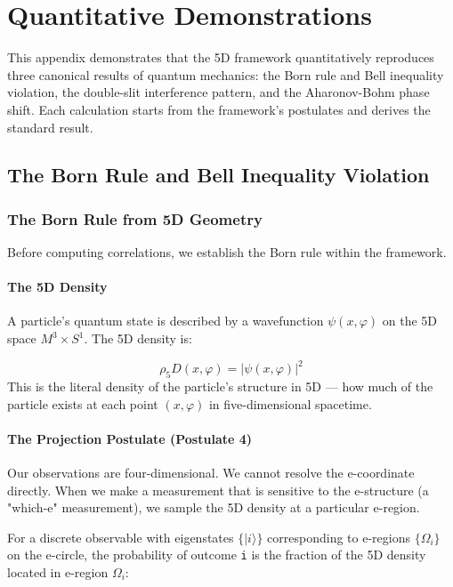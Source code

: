 \documentclass[aps,prd,preprint,superscriptaddress,longbibliography,floatfix]{revtex4-2}
\theoremstyle{remark}
\begin{document}
\section{Quantitative Demonstrations}

This appendix demonstrates that the 5D framework quantitatively reproduces three canonical results of quantum mechanics: the Born rule and Bell inequality violation, the double-slit interference pattern, and the Aharonov-Bohm phase shift. Each calculation starts from the framework's postulates and derives the standard result.



\subsection{The Born Rule and Bell Inequality Violation}


\subsubsection{The Born Rule from 5D Geometry}

Before computing correlations, we establish the Born rule within the framework.


\paragraph{The 5D Density}

A particle's quantum state is described by a wavefunction $\psi(x, \varphi)$ on the 5D space $M^{3} \times S^{1}$. The 5D density is:


\begin{equation}
    \rho_{5}D(x, \varphi) = |\psi(x, \varphi)|^{2}
\end{equation}
This is the literal density of the particle's structure in 5D --- how much of the particle exists at each point $(x, \varphi)$ in five-dimensional spacetime.


\paragraph{The Projection Postulate (Postulate 4)}

Our observations are four-dimensional. We cannot resolve the e-coordinate directly. When we make a measurement that is sensitive to the e-structure (a "which-e" measurement), we sample the 5D density at a particular e-region.

For a discrete observable with eigenstates $\{|i\rangle\}$ corresponding to e-regions $\{\Omega_{i}\}$ on the e-circle, the probability of outcome \texttt{i} is the fraction of the 5D density located in e-region $\Omega_{i}$:
\end{document}
